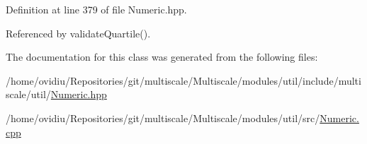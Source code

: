 Definition at line 379 of file Numeric.\-hpp.



Referenced by validate\-Quartile().



The documentation for this class was generated from the following files\-:\begin{DoxyCompactItemize}
\item 
/home/ovidiu/\-Repositories/git/multiscale/\-Multiscale/modules/util/include/multiscale/util/\hyperlink{Numeric_8hpp}{Numeric.\-hpp}\item 
/home/ovidiu/\-Repositories/git/multiscale/\-Multiscale/modules/util/src/\hyperlink{Numeric_8cpp}{Numeric.\-cpp}\end{DoxyCompactItemize}

